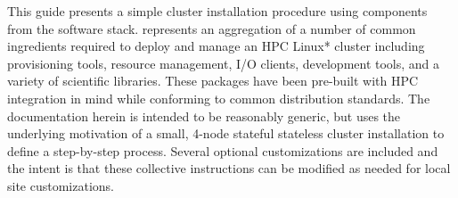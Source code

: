 This guide presents a simple cluster installation procedure using components
from the \OHPC{} software stack. \OHPC{} represents an aggregation of a number
of common ingredients required to deploy and manage an HPC Linux* cluster
including provisioning tools, resource management, I/O clients, development
tools, and a variety of scientific libraries. These packages have been
pre-built with HPC integration in mind while conforming to common \Linux{}
distribution standards.
The documentation herein is intended to
be reasonably generic, but uses the underlying motivation of a small, 4-node
 stateful \else stateless \fi 
cluster installation to define a step-by-step process. Several
optional customizations are included and the intent is that these collective
instructions can be modified as needed for local site customizations.
